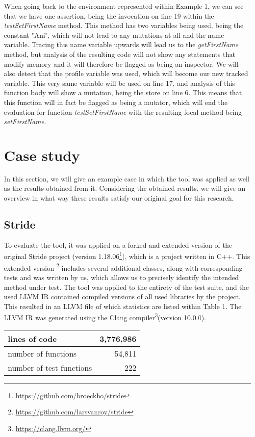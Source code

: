 \documentclass[11pt]{article}
\begin{document}
\begin{multicols}{2}
When going back to the environment represented within Example 1, we can see that we have one assertion, being the invocation on line 19 within the \textit{testSetFirstName} method. This method has two variables being used, being the constant "Ani", which will not lead to any mutations at all and the name variable. Tracing this name variable upwards will lead us to the \textit{getFirstName} method, but analysis of the resulting code will not show any statements that modify memory and it will therefore be flagged as being an inspector. We will also detect that the profile variable was used, which will become our new tracked variable. This very same variable will be used on line 17, and analysis of this function body will show a mutation, being the store on line 6. This means that this function will in fact be flagged as being a mutator, which will end the evaluation for function \textit{testSetFirstName} with the resulting focal method being \textit{setFirstName}.

\section{Case study}
In this section, we will give an example case in which the tool was applied as well as the results obtained from it. Considering the obtained results, we will give an overview in what way these results satisfy our original goal for this research.

\subsection{Stride}
To evaluate the tool, it was applied on a forked and extended version of the original Stride project (version 1.18.06\footnote{\url{https://github.com/broeckho/stride}}), which is a project written in C++. This extended version \footnote{\url{https://github.com/larsvanroy/stride}} includes several additional classes, along with corresponding tests and was written by us, which allows us to precisely identify the intended method under test. The tool was applied to the entirety of the test suite, and the used LLVM IR contained compiled versions of all used libraries by the project. This resulted in an LLVM file of which statistics are listed within Table 1. The LLVM IR was generated using the Clang compiler\footnote{\url{https://clang.llvm.org/}}(version 10.0.0).

\begin{center}
	\begin{tabular}{ |p{4.5cm}|r|  }
		\hline
		lines of code & 3,776,986\\
		\hline
		number of functions   & 54,811\\
		\hline
		number of test functions &   222\\
		\hline
	\end{tabular}
\end{center}


\end{multicols}
\end{document}
